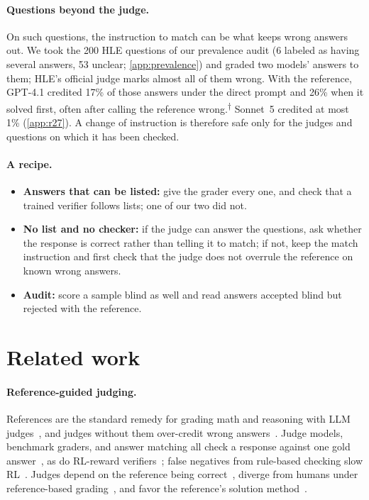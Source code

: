 \documentclass{article}
\newcommand{\ph}{\textsuperscript{$\dagger$}}
\begin{document}
\paragraph{Questions beyond the judge.}
On such questions, the instruction to match can be what keeps wrong answers out.
We took the 200 HLE questions of our prevalence audit (6 labeled as having several answers, 53 unclear; \cref{app:prevalence}) and graded two models' answers to them; HLE's official judge marks almost all of them wrong.
With the reference, GPT-4.1 credited 17\% of those answers under the direct prompt and 26\% when it solved first, often after calling the reference wrong.\ph{}
Sonnet~5 credited at most 1\% (\cref{app:r27}).
A change of instruction is therefore safe only for the judges and questions on which it has been checked.

\paragraph{A recipe.}
\begin{itemize}[leftmargin=1.2em,itemsep=0pt,topsep=1pt,parsep=0pt]
\item \textbf{Answers that can be listed:} give the grader every one, and check that a trained verifier follows lists; one of our two did not.
\item \textbf{No list and no checker:} if the judge can answer the questions, ask whether the response is correct rather than telling it to match; if not, keep the match instruction and first check that the judge does not overrule the reference on known wrong answers.
\item \textbf{Audit:} score a sample blind as well and read answers accepted blind but rejected with the reference.
\end{itemize}

\section{Related work}
\label{sec:related}

\paragraph{Reference-guided judging.}
References are the standard remedy for grading math and reasoning with LLM judges~\citep{zheng2023judging,refguided2024,chen2026rethinking}, and judges without them over-credit wrong answers~\citep{generous2026}. Judge models, benchmark graders, and answer matching all check a response against one gold answer~\citep{zhu2023judgelm,kim2024prometheus,wei2024simpleqa,wei2025browsecomp,phan2025hle,chandak2025answermatching}, as do RL-reward verifiers~\citep{chen2025xverify,liu2025compassverifier,yan2025verifybench}; false negatives from rule-based checking slow RL~\citep{xu2025tinyv,huang2025pitfalls}.
Judges depend on the reference being correct~\citep{judgingref2026,krumdick2025nofreelabels}, diverge from humans under reference-based grading~\citep{thakur2024judging}, and favor the reference's solution method~\citep{fixation2025}.
\end{document}
